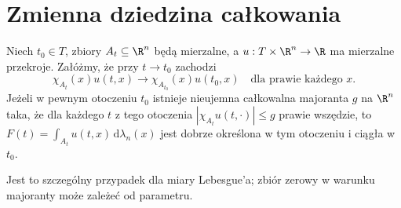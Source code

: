 \section{Zmienna dziedzina całkowania}

\begin{twierdzenie}
\label{ma2:thm:parameter-moving-domains}
Niech $t_0\in T$, zbiory $A_t\subseteq\R^n$
będą mierzalne, a
$u:T\times\R^n\to\R$ ma mierzalne przekroje.
Załóżmy, że przy $t\to t_0$ zachodzi
\[
 \chi_{A_t}(x)u(t,x)\to
 \chi_{A_{t_0}}(x)u(t_0,x)
 \quad\text{dla prawie każdego }x.
\]
Jeżeli w pewnym otoczeniu $t_0$ istnieje
nieujemna całkowalna majoranta $g$ na $\R^n$
taka, że dla każdego $t$ z tego otoczenia
$|\chi_{A_t}u(t,\cdot)|\le g$ prawie wszędzie,
to $F(t)=\int_{A_t}u(t,x)\,\mathrm d\lambda_n(x)$
jest dobrze określona w tym otoczeniu i ciągła w $t_0$.
\end{twierdzenie}
Jest to szczególny przypadek
dla miary Lebesgue'a; zbiór zerowy w warunku
majoranty może zależeć od parametru.

